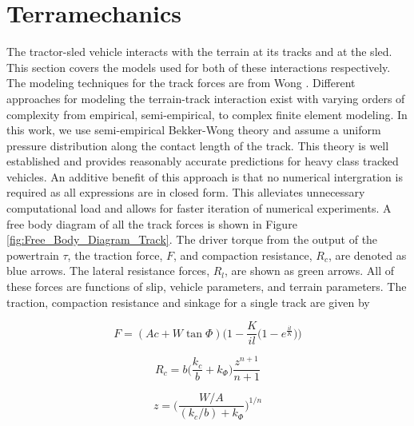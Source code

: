 \section{Terramechanics}
\label{s:Terramechanics}
The tractor-sled vehicle interacts with the terrain at its tracks and at the sled. This section covers the models used for both of these interactions respectively. The modeling techniques for the track forces are from Wong \cite{Wong2008}. Different approaches for modeling the terrain-track interaction exist with varying orders of complexity from empirical, semi-empirical, to complex finite element modeling. In this work, we use semi-empirical Bekker-Wong theory and assume a uniform pressure distribution along the contact length of the track. This theory is well established and provides reasonably accurate predictions for heavy class tracked vehicles. An additive benefit of this approach is that no numerical intergration is required as all expressions are in closed form. This alleviates unnecessary computational load and allows for faster iteration of numerical experiments. A free body diagram of all the track forces is shown in Figure \ref{fig:Free_Body_Diagram_Track}. The driver torque from the output of the powertrain $\tau$, the traction force, $F$, and compaction resistance, $R_c$, are denoted as blue arrows. The lateral resistance forces, $R_l$, are shown as green arrows. All of these forces are functions of slip, vehicle parameters, and terrain parameters. 
The traction, compaction resistance and sinkage for a single track are given by
\begin{linenomath*}
    \begin{equation} \label{eq:tractionForce}
        F = (Ac + W\tan\Phi) \Big(1 - \frac{K}{il} \Big(1 - e^{\frac{il}{K}}\Big) \Big)
    \end{equation}
\end{linenomath*}
\begin{linenomath*}
    \begin{equation} \label{eq:compactionResistance}
        R_c = b\bigg(\frac{k_c}{b} + k_\Phi\bigg)\frac{z^{n+1}}{n+1}
    \end{equation}
\end{linenomath*}
\begin{linenomath*}
    \begin{equation} \label{eq:sinkage}
        z = \bigg(\frac{W/A}{(k_c/b) + k_\Phi}\bigg)^{1/n}
    \end{equation}
\end{linenomath*}
